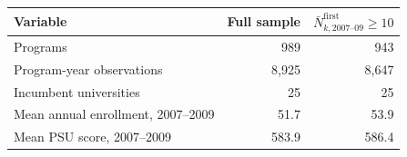 \begin{tabular}{lrr}
\toprule
Variable & Full sample & \(\bar N^{\mathrm{first}}_{k,2007\text{--}09}\geq10\) \\
\midrule
Programs &       989 &       943 \\
Program-year observations &     8,925 &     8,647 \\
Incumbent universities &        25 &        25 \\
Mean annual enrollment, 2007--2009 &      51.7 &      53.9 \\
Mean PSU score, 2007--2009 &     583.9 &     586.4 \\
\bottomrule
\end{tabular}
